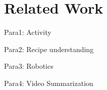 \section{Related Work}
Para1: Activity

Para2: Recipe understanding

Para3: Robotics

Para4: Video Summarization
